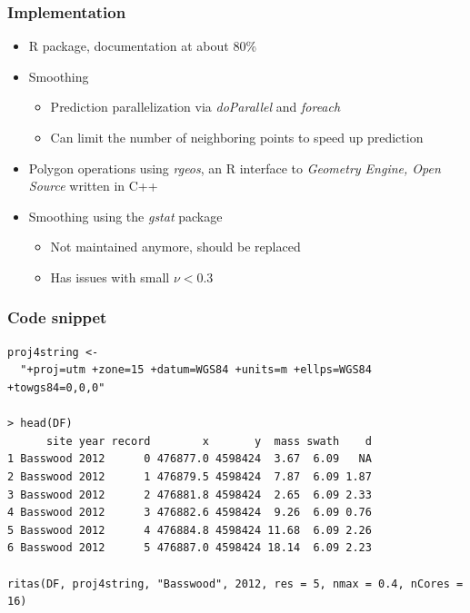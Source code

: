 \documentclass{beamer}
\begin{document}
\begin{frame}
  \frametitle{Implementation}

  
  \begin{itemize}
  \item<2-> R package, documentation at about 80\%
  \item<3-> Smoothing
    \begin{itemize}
    \item<4-> Prediction parallelization via \textit{doParallel} and
      \textit{foreach}
    \item<5-> Can limit the number of neighboring points to speed up prediction 
    \end{itemize}
  \item<6-> Polygon operations using \textit{rgeos}, an R interface to
    \textit{Geometry Engine, Open Source} written in C++
  \item<7-> Smoothing using the \textit{gstat} package
    \begin{itemize}
    \item<8-> Not maintained anymore, should be replaced
    \item<9-> Has issues with small $\nu < 0.3$
    \end{itemize}
  \end{itemize}

\end{frame}

\begin{frame}[fragile]
  \frametitle{Code snippet}

  \scriptsize
  \begin{verbatim}
proj4string <-
  "+proj=utm +zone=15 +datum=WGS84 +units=m +ellps=WGS84 +towgs84=0,0,0"

> head(DF)
      site year record        x       y  mass swath    d
1 Basswood 2012      0 476877.0 4598424  3.67  6.09   NA
2 Basswood 2012      1 476879.5 4598424  7.87  6.09 1.87
3 Basswood 2012      2 476881.8 4598424  2.65  6.09 2.33
4 Basswood 2012      3 476882.6 4598424  9.26  6.09 0.76
5 Basswood 2012      4 476884.8 4598424 11.68  6.09 2.26
6 Basswood 2012      5 476887.0 4598424 18.14  6.09 2.23

ritas(DF, proj4string, "Basswood", 2012, res = 5, nmax = 0.4, nCores = 16)
\end{verbatim}

\end{frame}
\end{document}
